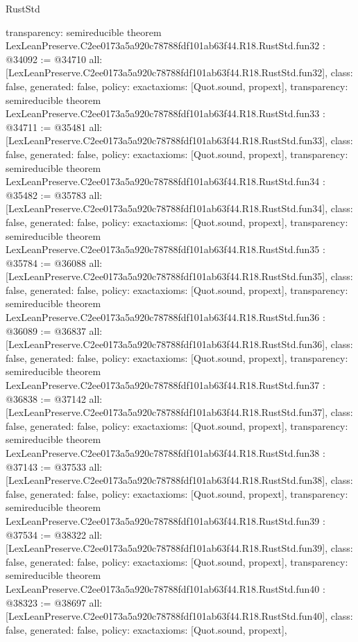 \begin{lexlean}{RustStd}
\begin{coremodule}
{  transparency: semireducible
}
theorem LexLeanPreserve.C2ee0173a5a920c78788fdf101ab63f44.R18.RustStd.fun32 : @34092 := @34710 {
  all: [LexLeanPreserve.C2ee0173a5a920c78788fdf101ab63f44.R18.RustStd.fun32],
  class: false,
  generated: false,
  policy: exact{axioms: [Quot.sound, propext]},
  transparency: semireducible
}
theorem LexLeanPreserve.C2ee0173a5a920c78788fdf101ab63f44.R18.RustStd.fun33 : @34711 := @35481 {
  all: [LexLeanPreserve.C2ee0173a5a920c78788fdf101ab63f44.R18.RustStd.fun33],
  class: false,
  generated: false,
  policy: exact{axioms: [Quot.sound, propext]},
  transparency: semireducible
}
theorem LexLeanPreserve.C2ee0173a5a920c78788fdf101ab63f44.R18.RustStd.fun34 : @35482 := @35783 {
  all: [LexLeanPreserve.C2ee0173a5a920c78788fdf101ab63f44.R18.RustStd.fun34],
  class: false,
  generated: false,
  policy: exact{axioms: [Quot.sound, propext]},
  transparency: semireducible
}
theorem LexLeanPreserve.C2ee0173a5a920c78788fdf101ab63f44.R18.RustStd.fun35 : @35784 := @36088 {
  all: [LexLeanPreserve.C2ee0173a5a920c78788fdf101ab63f44.R18.RustStd.fun35],
  class: false,
  generated: false,
  policy: exact{axioms: [Quot.sound, propext]},
  transparency: semireducible
}
theorem LexLeanPreserve.C2ee0173a5a920c78788fdf101ab63f44.R18.RustStd.fun36 : @36089 := @36837 {
  all: [LexLeanPreserve.C2ee0173a5a920c78788fdf101ab63f44.R18.RustStd.fun36],
  class: false,
  generated: false,
  policy: exact{axioms: [Quot.sound, propext]},
  transparency: semireducible
}
theorem LexLeanPreserve.C2ee0173a5a920c78788fdf101ab63f44.R18.RustStd.fun37 : @36838 := @37142 {
  all: [LexLeanPreserve.C2ee0173a5a920c78788fdf101ab63f44.R18.RustStd.fun37],
  class: false,
  generated: false,
  policy: exact{axioms: [Quot.sound, propext]},
  transparency: semireducible
}
theorem LexLeanPreserve.C2ee0173a5a920c78788fdf101ab63f44.R18.RustStd.fun38 : @37143 := @37533 {
  all: [LexLeanPreserve.C2ee0173a5a920c78788fdf101ab63f44.R18.RustStd.fun38],
  class: false,
  generated: false,
  policy: exact{axioms: [Quot.sound, propext]},
  transparency: semireducible
}
theorem LexLeanPreserve.C2ee0173a5a920c78788fdf101ab63f44.R18.RustStd.fun39 : @37534 := @38322 {
  all: [LexLeanPreserve.C2ee0173a5a920c78788fdf101ab63f44.R18.RustStd.fun39],
  class: false,
  generated: false,
  policy: exact{axioms: [Quot.sound, propext]},
  transparency: semireducible
}
theorem LexLeanPreserve.C2ee0173a5a920c78788fdf101ab63f44.R18.RustStd.fun40 : @38323 := @38697 {
  all: [LexLeanPreserve.C2ee0173a5a920c78788fdf101ab63f44.R18.RustStd.fun40],
  class: false,
  generated: false,
  policy: exact{axioms: [Quot.sound, propext]},
}
\end{coremodule}
\end{lexlean}
